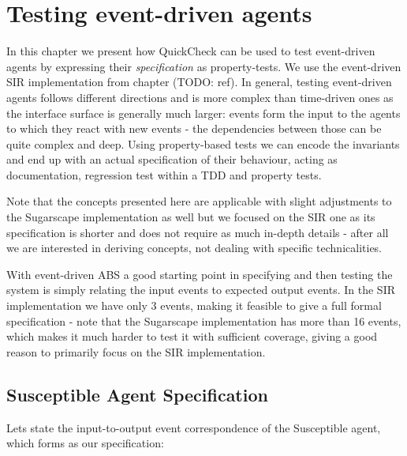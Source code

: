 \chapter{Testing event-driven agents}

In this chapter we present how QuickCheck can be used to test event-driven agents by expressing their \textit{specification} as
property-tests. We use the event-driven SIR implementation from chapter (TODO: ref).
In general, testing event-driven agents follows different directions and is more complex than time-driven ones as the interface surface is generally much larger: events form the input to the agents to which they react with new events - the dependencies between those can be quite complex and deep. Using property-based tests we can encode the invariants and end up with an actual specification of their behaviour, acting as documentation, regression test within a TDD and property tests.

Note that the concepts presented here are applicable with slight adjustments to the Sugarscape implementation as well but we focused on the SIR one as its specification is shorter and does not require as much in-depth details - after all we are interested in deriving concepts, not dealing with specific technicalities.

With event-driven ABS a good starting point in specifying and then testing the system is simply relating the input events to expected output events. In the SIR implementation we have only 3 events, making it feasible to give a full formal specification - note that the Sugarscape implementation has more than 16 events, which makes it much harder to test it with sufficient coverage, giving a good reason to primarily focus on the SIR implementation. 

\section{Susceptible Agent Specification}
Lets state the input-to-output event correspondence of the Susceptible agent, which forms as our specification:

